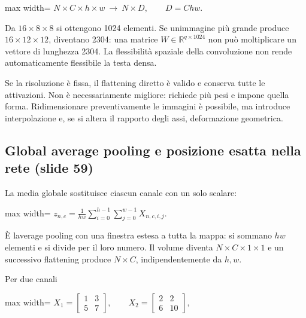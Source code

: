 \documentclass[11pt,a4paper,oneside,openany]{book}
\begin{document}
\begin{center}
\begin{adjustbox}{max width=\linewidth}
$\displaystyle \boxed{N\times C\times h\times w\ \longrightarrow\ N\times D,\qquad D=Chw.}$
\end{adjustbox}
\end{center}

Da \(16\times8\times8\) si ottengono 1024 elementi. Se un\textquotesingle immagine più grande produce \(16\times12\times12\), diventano 2304: una matrice \(W\in\mathbb{R}^{q\times1024}\) non può moltiplicare un vettore di lunghezza 2304. La flessibilità spaziale della convoluzione non rende automaticamente flessibile la testa densa.

Se la risoluzione è fissa, il flattening diretto è valido e conserva tutte le attivazioni. Non è necessariamente migliore: richiede più pesi e impone quella forma. Ridimensionare preventivamente le immagini è possibile, ma introduce interpolazione e, se si altera il rapporto degli assi, deformazione geometrica.

\subsection{Global average pooling e posizione esatta nella rete (slide 59)}\label{f02-r905}

La media globale sostituisce ciascun canale con un solo scalare:

\begin{center}
\begin{adjustbox}{max width=\linewidth}
$\displaystyle \boxed{z_{n,c}=\frac1{hw}\sum_{i=0}^{h-1}\sum_{j=0}^{w-1}X_{n,c,i,j}.}$
\end{adjustbox}
\end{center}

È l\textquotesingle average pooling con una finestra estesa a tutta la mappa: si sommano \(hw\) elementi e si divide per il loro numero. Il volume diventa \(N\times C\times1\times1\) e un successivo flattening produce \(N\times C\), indipendentemente da \(h,w\).

Per due canali

\begin{center}
\begin{adjustbox}{max width=\linewidth}
$\displaystyle X_1=\begin{bmatrix}1&3\\5&7\end{bmatrix},\qquad X_2=\begin{bmatrix}2&2\\6&10\end{bmatrix},$
\end{adjustbox}
\end{center}
\end{document}
